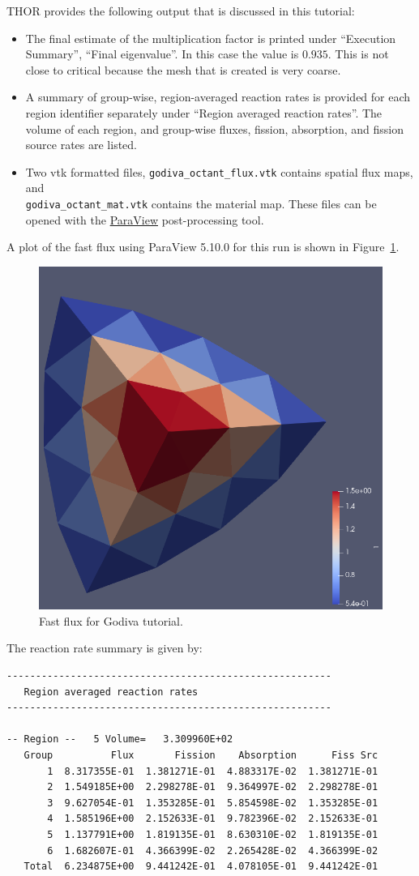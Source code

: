 \ac{THOR} provides the following output that is discussed in this tutorial:
\begin{itemize}
    \item The final estimate of the multiplication factor is printed under ``Execution Summary'', ``Final eigenvalue''.
    In this case the value is $0.935$. This is not close to critical because the mesh that
    is created is very coarse.
    \item A summary of group-wise, region-averaged reaction rates is provided for each region identifier separately under ``Region averaged reaction rates''.
    The volume of each region, and group-wise fluxes, fission, absorption, and fission source rates are listed.
    \item Two vtk formatted files, \verb"godiva_octant_flux.vtk" contains spatial flux maps, and \\
    \verb"godiva_octant_mat.vtk" contains the material map. These files can be opened with the \href{https://www.paraview.org/download/}{ParaView} post-processing tool.
\end{itemize}

A plot of the fast flux using ParaView 5.10.0 for this run is shown in Figure~\ref{fig:godiva_fast}.
\begin{figure}[th]
  \center
  \includegraphics[height=0.5\textwidth]{chapters/tutorials/figures/godiva_fast.png}
  \caption{Fast flux for Godiva tutorial.}
  \label{fig:godiva_fast}
\end{figure}

The reaction rate summary is given by:
\begin{verbatim}
--------------------------------------------------------
   Region averaged reaction rates
--------------------------------------------------------

-- Region --   5 Volume=   3.309960E+02
   Group          Flux       Fission    Absorption      Fiss Src
       1  8.317355E-01  1.381271E-01  4.883317E-02  1.381271E-01
       2  1.549185E+00  2.298278E-01  9.364997E-02  2.298278E-01
       3  9.627054E-01  1.353285E-01  5.854598E-02  1.353285E-01
       4  1.585196E+00  2.152633E-01  9.782396E-02  2.152633E-01
       5  1.137791E+00  1.819135E-01  8.630310E-02  1.819135E-01
       6  1.682607E-01  4.366399E-02  2.265428E-02  4.366399E-02
   Total  6.234875E+00  9.441242E-01  4.078105E-01  9.441242E-01
\end{verbatim}

